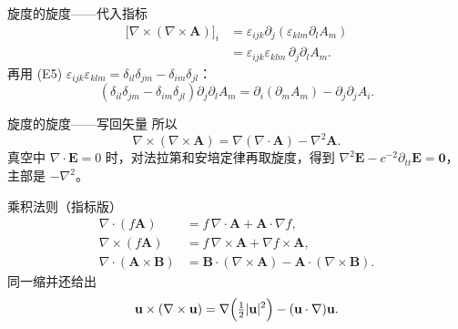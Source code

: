 \documentclass[fontset=windows, chinese, 10pt, xcolor=dvipsnames]{beamer}
\begin{document}
\begin{frame}{旋度的旋度——代入指标}
  \begin{align*}
    \bigl[\nabla\times(\nabla\times\mathbf{A})\bigr]_i
    &=\varepsilon_{ijk}\partial_j(\varepsilon_{klm}\partial_l A_m) \\
    &=\varepsilon_{ijk}\varepsilon_{klm}\,\partial_j\partial_l A_m.
  \end{align*}
  再用 (E5)
  $\varepsilon_{ijk}\varepsilon_{klm}=\delta_{il}\delta_{jm}-\delta_{im}\delta_{jl}$：
  \begin{equation*}
    (\delta_{il}\delta_{jm}-\delta_{im}\delta_{jl})\partial_j\partial_l A_m
    =\partial_i(\partial_m A_m)-\partial_j\partial_j A_i.
  \end{equation*}
\end{frame}

\begin{frame}{旋度的旋度——写回矢量}
  所以
  \begin{equation*}
    \boxed{\nabla\times(\nabla\times\mathbf{A})
    =\nabla(\nabla\cdot\mathbf{A})-\nabla^2\mathbf{A}.}
  \end{equation*}
  真空中 $\nabla\cdot\mathbf{E}=0$ 时，对法拉第和安培定律再取旋度，得到
  $\nabla^2\mathbf{E}-c^{-2}\partial_{tt}\mathbf{E}=\mathbf{0}$，主部是 $-\nabla^2$。
\end{frame}

\begin{frame}{乘积法则（指标版）}
  \begin{align*}
    \nabla\cdot(f\mathbf{A})
    &=f\,\nabla\cdot\mathbf{A}+\mathbf{A}\cdot\nabla f,\\
    \nabla\times(f\mathbf{A})
    &=f\,\nabla\times\mathbf{A}+\nabla f\times\mathbf{A},\\
    \nabla\cdot(\mathbf{A}\times\mathbf{B})
    &=\mathbf{B}\cdot(\nabla\times\mathbf{A})
      -\mathbf{A}\cdot(\nabla\times\mathbf{B}).
  \end{align*}
  同一缩并还给出
  \begin{equation*}
    \mathbf{u}\times(\nabla\times\mathbf{u})
    =\nabla\Bigl(\tfrac12|\mathbf{u}|^2\Bigr)
    -(\mathbf{u}\cdot\nabla)\mathbf{u}.
  \end{equation*}
\end{frame}
\end{document}
